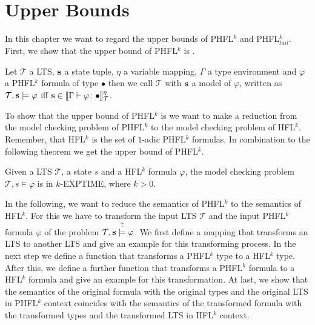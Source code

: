 
\chapter{Upper Bounds}\label{ch:upperBounds}

In this chapter we want to regard the upper bounds of PHFL$^k$ and PHFL$^k_{tail}$. First, we show that the upper
bound of PHFL$^k$ is .

\begin{definition}
    Let $\mathcal{T}$ a LTS, $\emph{s}$ a state tuple, $\eta$ a variable mapping, $\Gamma$ a type environment and
    $\varphi$ a PHFL$^k$ formula of type $\bullet$ then we call $\mathcal{T}$ with $\emph{s}$ a model of $\varphi$,
    written as $\mathcal{T}, \emph{s} \models \varphi$ iff $\emph{s} \in \llbracket \Gamma
    \vdash \varphi \colon \bullet \rrbracket^\eta_\mathcal{T}$.
\end{definition}

To show that the upper bound of PHFL$^k$ is  we want to make a reduction from the model checking
problem of PHFL$^k$ to the model checking problem of HFL$^k$. Remember, that HFL$^k$ is the set of $1$-adic PHFL$^k$
formulas. In combination to the following theorem we get the upper bound of PHFL$^k$.

\begin{theorem}{\cite{axelsson2007complexity}}
    \label{theorem:hfl_k_in_k_exptime}
    Given a LTS $\mathcal{T}$, a state $s$ and a HFL$^k$ formula $\varphi$, the model checking problem $\mathcal{T}, s
    \models \varphi$ is in $k$-EXPTIME, where $k > 0$.
\end{theorem}

In the following, we want to reduce the semantics of PHFL$^k$ to the semantics of HFL$^k$.
For this we have to transform the input LTS $\mathcal{T}$ and the input PHFL$^k$ formula $\varphi$ of the problem
$\mathcal{T}, \emph{s} \overset{?}{\models} \varphi$. We first define a mapping that transforms an LTS to another
LTS and give an example for this transforming process. In the next step we define a function that transforms a
PHFL$^k$ type to a HFL$^k$ type. After this, we define a further function that transforms a PHFL$^k$ formula to a
HFL$^k$ formula and give an example for this transformation. At last, we show that the semantics of the original
formula with the original types and the original LTS in PHFL$^k$ context coincides with the semantics of the
transformed formula with the transformed types and the transformed LTS in HFL$^k$ context.

